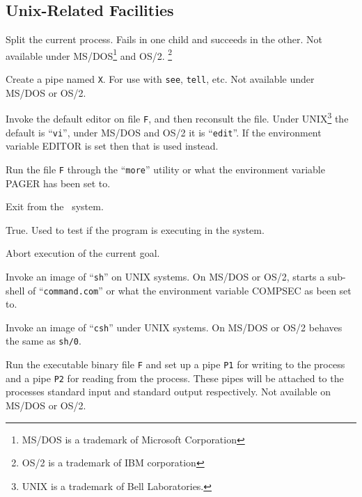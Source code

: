 \subsection{Unix-Related Facilities}

\begin{description}

Split the current process. Fails in one child and succeeds in the other.
\chgbarbegin
Not available under MS/DOS\footnote{MS/DOS is a trademark of Microsoft
Corporation} and OS/2.
\footnote{OS/2 is a trademark of IBM corporation}
\chgbarend

Create a pipe named {\tt X}. For use with {\tt see}, {\tt tell}, etc.
\chgbarbegin
Not available under MS/DOS or OS/2.
\chgbarend

Invoke the default editor on file {\tt F}, and then reconsult the file.
\chgbarbegin
Under UNIX\footnote{UNIX is a trademark of Bell Laboratories.}
the default is ``{\tt vi}'', under MS/DOS and OS/2 it is ``{\tt edit}''.
If the environment variable EDITOR is set then that is used instead.
\chgbarend

Run the file {\tt F} through the ``{\tt more}'' utility or 
what the environment variable PAGER
has been set to.

Exit from the \CLPR\ system.

True.  Used to test if the program is executing in the \CLPR{} system.

Abort execution of the current goal.

Invoke an image of ``{\tt sh}'' on UNIX systems.
\chgbarbegin
On MS/DOS or OS/2, starts a sub-shell of ``{\tt command.com}'' or what
the environment variable COMPSEC as been set to.
\chgbarend

Invoke an image of ``{\tt csh}'' under UNIX systems.
\chgbarbegin
On MS/DOS or OS/2 behaves the same as {\tt sh/0}.
\chgbarend

Run the executable binary file {\tt F} and set up a pipe {\tt P1} for writing
to the process and a pipe {\tt P2} for reading from the process. These pipes
will be attached to the processes standard input and standard output
respectively.
\chgbarbegin
Not available on MS/DOS or OS/2.
\chgbarend


\end{description}

